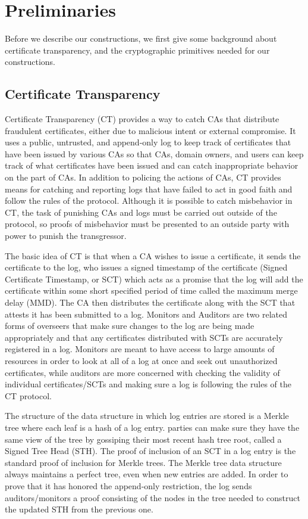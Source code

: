 \documentclass[letterpaper,twocolumn,10pt]{article}
\begin{document}
\section{Preliminaries}

Before we describe our constructions, we first give some
background about certificate transparency, and the cryptographic primitives needed for our constructions. 

\subsection{Certificate Transparency}
Certificate Transparency (CT) \cite{CT,RFC} provides a way to catch CAs that distribute fraudulent certificates, either due to malicious intent or external compromise. It uses a public, untrusted, and append-only log to keep track of certificates that have been issued by various CAs so that CAs, domain owners, and users can keep track of what certificates have been issued and can catch inappropriate behavior on the part of CAs. In addition to policing the actions of CAs, CT provides means for catching and reporting logs that have failed to act in good faith and follow the rules of the protocol. Although it is possible to catch misbehavior in CT, the task of punishing CAs and logs must be carried out outside of the protocol, so proofs of misbehavior must be presented to an outside party with power to punish the transgressor.

The basic idea of CT is that when a CA wishes to issue a certificate, it sends the certificate to the log, who issues a signed timestamp of the certificate (Signed Certificate Timestamp, or SCT) which acts as a promise that the log will add the certificate within some short specified period of time called the maximum merge delay (MMD). The CA then distributes the certificate along with the SCT that attests it has been submitted to a log. Monitors and Auditors are two related forms of overseers that make sure changes to the log are being made appropriately and that any certificates distributed with SCTs are accurately registered in a log. Monitors are meant to have access to large amounts of resources in order to look at all of a log at once and seek out unauthorized certificates, while auditors are more concerned with checking the validity of individual certificates/SCTs and making sure a log is following the rules of the CT protocol.

The structure of the data structure in which log entries are stored is a Merkle tree where each leaf is a hash of a log entry. parties can make sure they have the same view of the tree by gossiping their most recent hash tree root, called a Signed Tree Head (STH). The proof of inclusion of an SCT in a log entry is the standard proof of inclusion for Merkle trees. The Merkle tree data structure always maintains a perfect tree, even when new entries are added. In order to prove that it has honored the append-only restriction, the log sends auditors/monitors a proof consisting of the nodes in the tree needed to construct the updated STH from the previous one. 
\end{document}
